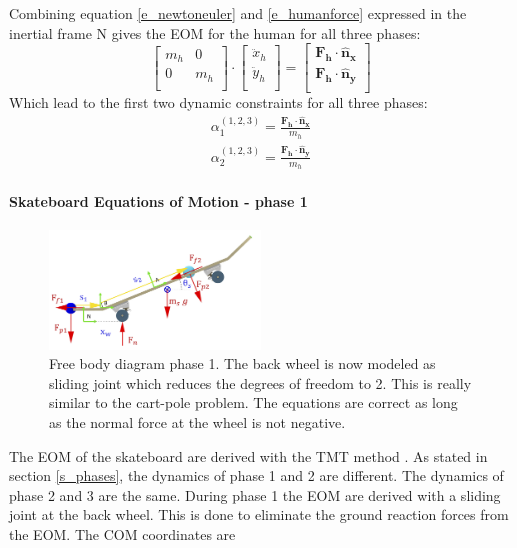 Combining equation \ref{e_newtoneuler} and \ref{e_humanforce} expressed in the inertial frame N gives the EOM for the human for all three phases:
\begin{equation}
    \left[\begin{array}{cc}
        m_h & 0 \\
        0 & m_h \\
    \end{array}\right] \cdot \left[\begin{array}{c}
         \ddot x_h  \\
         \ddot y_h \\
    \end{array}\right]=\left[\begin{array}{c}
        \mathbf{F_h}\cdot \mathbf{\hat n_x}  \\
        \mathbf{F_h}\cdot \mathbf{\hat n_y}\\
    \end{array}\right]
\end{equation}
Which lead to the first two dynamic constraints for all three phases:
\begin{equation}
\begin{split}
        \alpha_{1}^{(1,2,3)} = \frac{\mathbf{F_h}\cdot \mathbf{\hat n_x}}{m_h}\\
        \alpha_{2}^{(1,2,3)} = \frac{\mathbf{F_h}\cdot \mathbf{\hat n_y}}{m_h}
\end{split}
\end{equation}

\paragraph{Skateboard Equations of Motion - phase 1}
\begin{figure}[b]
    \centering
    \includegraphics[width = 0.5\textwidth]{figure/FBD_phase1.png}
    \caption[Free body diagram phase 1]{Free body diagram phase 1. The back wheel is now modeled as sliding joint which reduces the degrees of freedom to 2. This is really  similar to the cart-pole problem. The equations are correct as long as the normal force at the wheel is not negative.}
    \label{f_FBDphas1}
\end{figure}
The EOM of the skateboard are derived with the TMT method \cite{vallery_heike_advanced_2018}. As stated in section \ref{s_phases}, the dynamics of phase 1 and 2 are different. The dynamics of phase 2 and 3 are the same. During phase 1 the EOM are derived with a sliding joint at the back wheel. This is done to eliminate the ground reaction forces from the EOM. The COM coordinates are

